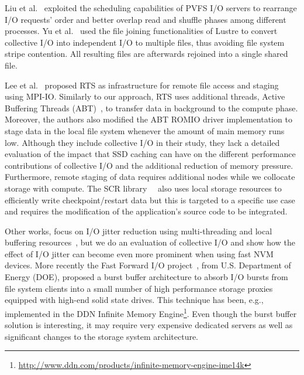 Liu et al.~\cite{Liu2013} exploited the scheduling capabilities of PVFS I/O servers to rearrange I/O requests' order and better overlap read and shuffle phases among different processes. 
Yu et al.~\cite{Yu2007} used the file joining functionalities of Lustre to convert collective I/O into independent I/O to multiple files, thus avoiding file system stripe contention. All 
resulting files are afterwards rejoined into a single shared file.

Lee et al.~\cite{LeeRTXW04} proposed RTS as infrastructure for remote file access and staging using MPI-IO. Similarly to our approach, RTS uses additional threads, 
Active Buffering Threads (ABT)~\cite{XiaosongWLS03}, to transfer data in background to the compute phase. Moreover, the authors also modified the ABT ROMIO driver implementation to stage data in 
the local file system whenever the amount of main memory runs low. Although they include collective I/O in their study, they lack a detailed evaluation of the impact that SSD caching can have on 
the different performance contributions of collective I/O and the additional reduction of memory pressure. Furthermore, remote staging of data requires additional nodes while we collocate storage 
with compute. The SCR library~\cite{Moody2010}~\cite{Moody2010_2} also uses local storage resources to efficiently write checkpoint/restart data but this is targeted to a specific use case and requires the modification of 
the application's source code to be integrated. 

Other works, focus on I/O jitter reduction using multi-threading and local buffering resources~\cite{DorierACSO12}, but we do an evaluation of collective I/O and show how the effect of I/O jitter can 
become even more prominent when using fast NVM devices. More recently the Fast Forward I/O project~\cite{Lofstead2016}, from U.S. Department of Energy (DOE), proposed a burst buffer architecture to absorb 
I/O bursts from file system clients into a small number of high performance storage proxies equipped with high-end solid state drives. This technique has been, e.g., implemented in the DDN Infinite Memory 
Engine\footnote{\url{http://www.ddn.com/products/infinite-memory-engine-ime14k}}. Even though the burst buffer solution is interesting, it may require very expensive dedicated servers as well as significant 
changes to the storage system architecture. 

